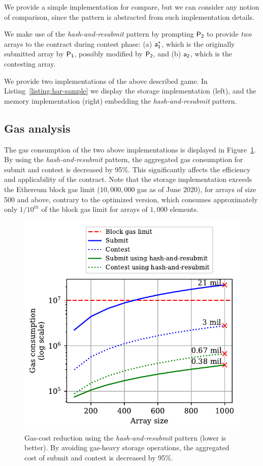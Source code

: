 % 

We provide a simple implementation for \textsf{compare}, but we can consider
any notion of comparison, since the pattern is abstracted from such
implementation details.

We make use of the \emph{hash-and-resubmit} pattern by prompting $\mathsf{P_2}$ to
provide \emph{two} arrays to the contract during contest phase: (a) $\mathsf{a_1^*}$,
which is the originally submitted array by $\mathsf{P_1}$, possibly modified by $\mathsf{P_2}$,
and (b) $\mathsf{a_2}$, which is the contesting array.

We provide two implementations of the above described game.  In
Listing~\ref{listing:har-sample} we display the storage implementation (left),
and the memory implementation (right) embedding the \emph{hash-and-resubmit}
pattern.



\subsection{Gas analysis} The gas consumption of the two above
implementations is displayed in Figure~\ref{fig:har-example}. By using the
\emph{hash-and-resubmit} pattern, the aggregated gas consumption for
\textsf{submit} and \textsf{contest} is decreased by 95\%. This significantly
affects the efficiency and applicability of the contract. Note that the storage
implementation exceeds the Ethereum block gas limit ($10{,}000{,}000$ gas as of
June 2020), for arrays of size 500 and above, contrary to the optimized
version, which consumes approximately only $1/10^{th}$ of the block gas limit
for arrays of $1{,}000$ elements.

\begin{figure}[!h]
\begin{center}
\includegraphics[width=0.6 \columnwidth]{figures/har-example.pdf}
\end{center}
\caption{Gas-cost reduction using the \emph{hash-and-resubmit} pattern (lower
is better). By avoiding gas-heavy storage operations, the aggregated cost of
\textsf{submit} and \textsf{contest} is decreased by 95\%.}
\label{fig:har-example}
\end{figure}

